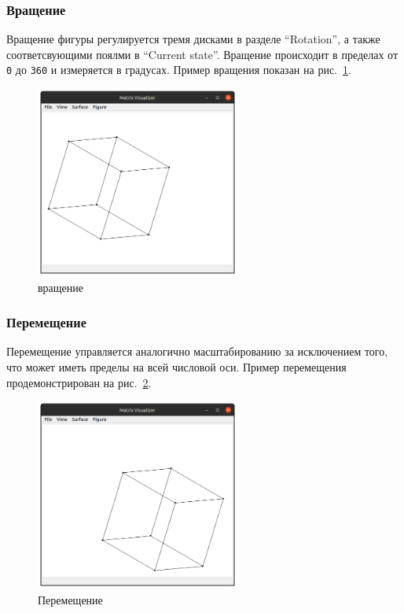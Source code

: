 \documentclass[12pt, a4paper, hidelinks]{article}
\begin{document}
\subsubsection{Вращение}
Вращение фигуры регулируется тремя дисками в разделе \enquote{Rotation}, а также соответсвующими поялми в \enquote{Current state}. Вращение происходит в пределах от \verb|0| до \verb|360| и измеряется в градусах. Пример вращения показан на рис.~\ref{rotation}.

\begin{figure}[htbp!]
	\centering
	\includegraphics[width=0.6\textwidth]{images/rotation.png}
	\caption{вращение}
	\label{rotation}
\end{figure}

\subsubsection{Перемещение}
Перемещение управляется аналогично масштабированию за исключением того, что может иметь пределы на всей числовой оси. Пример перемещения продемонстрирован на рис.~\ref{movement}.
\begin{figure}[htbp!]
	\centering
	\includegraphics[width=0.6\textwidth]{images/movement.png}
	\caption{Перемещение}
	\label{movement}
\end{figure}
\end{document}
